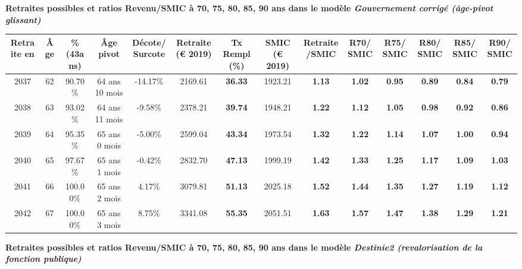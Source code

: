  \vspace{0.1cm} 
{\bf \noindent Retraites possibles et ratios Revenu/SMIC à 70, 75, 80, 85, 90 ans dans le modèle \emph{Gouvernement corrigé (âge-pivot glissant)}}  
 
\begin{adjustbox}{max width=\textwidth} 
\begin{tabular}[htb]{|c|c||c|c|c||c|c||c|c||c|c|c|c|c|} 
\hline 
 Retraite en &  Âge &  \%(43ans) &  Âge pivot &  Décote/Surcote &  Retraite (\euro{} 2019) &  Tx Rempl(\%) &  SMIC (\euro{} 2019) &  Retraite/SMIC &  R70/SMIC &  R75/SMIC &  R80/SMIC &  R85/SMIC &  R90/SMIC \\ 
\hline \hline 
 2037 &  62 &  90.70\% &  64 ans 10 mois &  -14.17\% &  2169.61 &  {\bf 36.33} &  1923.21 &  {\bf 1.13} &  {\bf 1.02} &  {\bf {\color{red} 0.95}} &  {\bf {\color{red} 0.89}} &  {\bf {\color{red} 0.84}} &  {\bf {\color{red} 0.79}} \\ 
\hline 
 2038 &  63 &  93.02\% &  64 ans 11 mois &  -9.58\% &  2378.21 &  {\bf 39.74} &  1948.21 &  {\bf 1.22} &  {\bf 1.12} &  {\bf 1.05} &  {\bf {\color{red} 0.98}} &  {\bf {\color{red} 0.92}} &  {\bf {\color{red} 0.86}} \\ 
\hline 
 2039 &  64 &  95.35\% &  65 ans 0 mois &  -5.00\% &  2599.04 &  {\bf 43.34} &  1973.54 &  {\bf 1.32} &  {\bf 1.22} &  {\bf 1.14} &  {\bf 1.07} &  {\bf 1.00} &  {\bf {\color{red} 0.94}} \\ 
\hline 
 2040 &  65 &  97.67\% &  65 ans 1 mois &  -0.42\% &  2832.70 &  {\bf 47.13} &  1999.19 &  {\bf 1.42} &  {\bf 1.33} &  {\bf 1.25} &  {\bf 1.17} &  {\bf 1.09} &  {\bf 1.03} \\ 
\hline 
 2041 &  66 &  100.00\% &  65 ans 2 mois &  4.17\% &  3079.81 &  {\bf 51.13} &  2025.18 &  {\bf 1.52} &  {\bf 1.44} &  {\bf 1.35} &  {\bf 1.27} &  {\bf 1.19} &  {\bf 1.12} \\ 
\hline 
 2042 &  67 &  100.00\% &  65 ans 3 mois &  8.75\% &  3341.08 &  {\bf 55.35} &  2051.51 &  {\bf 1.63} &  {\bf 1.57} &  {\bf 1.47} &  {\bf 1.38} &  {\bf 1.29} &  {\bf 1.21} \\ 
\hline 
\hline 
\end{tabular} 
\end{adjustbox} 
 
 \vspace{0.1cm} 
{\bf \noindent Retraites possibles et ratios Revenu/SMIC à 70, 75, 80, 85, 90 ans dans le modèle \emph{Destinie2 (revalorisation de la fonction publique)}}  
 
